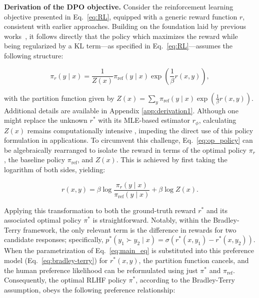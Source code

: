 \textbf{Derivation of the DPO objective.} Consider the reinforcement learning objective presented in Eq.~\ref{eq:RL}, equipped with a generic reward function $r$, consistent with earlier approaches. Building on the foundation laid by previous works~\citep{peters2007reinforcement, peng2019advantage, korbak2022reinforcement, go2023aligning}, it follows directly that the policy which maximizes the reward while being regularized by a KL term—as specified in Eq.~\ref{eq:RL}—assumes the following structure:

\begin{equation}\label{eq:op_policy}
    \pi_r(y\mid x) = \frac{1}{Z(x)}\pi_\text{ref}(y\mid x)\exp\left(\frac{1}{\beta}r(x, y)\right),
\end{equation}

with the partition function given by $Z(x) = \sum_{y}\pi_\text{ref}(y\mid x)\exp\left(\frac{1}{\beta}r(x, y)\right)$. Additional details are available in Appendix \ref{app:derivation1}. Although one might replace the unknown $r^*$ with its MLE-based estimator $r_{\phi}$, calculating $Z(x)$ remains computationally intensive \citep{korbak2022reinforcement, go2023aligning}, impeding the direct use of this policy formulation in applications. To circumvent this challenge, Eq.~\ref{eq:op_policy} can be algebraically rearranged to isolate the reward in terms of the optimal policy $\pi_r$, the baseline policy $\pi_\text{ref}$, and $Z(x)$. This is achieved by first taking the logarithm of both sides, yielding:

\begin{equation}\label{eq:main_eq}
    r(x,y) =\beta \log \frac{\pi_r(y\mid x)}{\pi_\text{ref}(y\mid x)} + \beta \log Z(x).
\end{equation}

Applying this transformation to both the ground-truth reward $r^*$ and its associated optimal policy $\pi^*$ is straightforward. Notably, within the Bradley-Terry framework, the only relevant term is the difference in rewards for two candidate responses; specifically, ${p^*(y_1 \succ y_2 \mid x) = \sigma(r^*(x, y_1) - r^*(x, y_2))}$. When the parametrization of Eq.~\ref{eq:main_eq} is substituted into this preference model (Eq.~\ref{eq:bradley-terry}) for $r^*(x,y)$, the partition function cancels, and the human preference likelihood can be reformulated using just $\pi^*$ and $\pi_\text{ref}$. Consequently, the optimal RLHF policy $\pi^*$, according to the Bradley-Terry assumption, obeys the following preference relationship:

